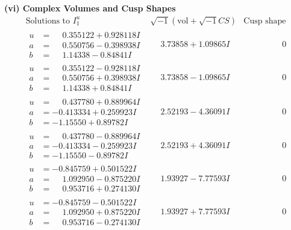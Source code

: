 \documentclass[1p]{elsarticle_modified}
\theoremstyle{definition}
\newcommand{\I}{\sqrt{-1}}
\begin{document}
\newpage\flushleft \textbf{(vi) Complex Volumes and Cusp Shapes}
$$\begin{array}{c|c|c}  
\text{Solutions to }I^u_{1}& \I (\text{vol} + \sqrt{-1}CS) & \text{Cusp shape}\\
 \hline 
\begin{aligned}
u &= \phantom{-}0.355122 + 0.928118 I \\
a &= \phantom{-}0.550756 - 0.398938 I \\
b &= \phantom{-}1.14338 - 0.84841 I\end{aligned}
 & \phantom{-}3.73858 + 1.09865 I & \phantom{-0.000000 } 0 \\ \hline\begin{aligned}
u &= \phantom{-}0.355122 - 0.928118 I \\
a &= \phantom{-}0.550756 + 0.398938 I \\
b &= \phantom{-}1.14338 + 0.84841 I\end{aligned}
 & \phantom{-}3.73858 - 1.09865 I & \phantom{-0.000000 } 0 \\ \hline\begin{aligned}
u &= \phantom{-}0.437780 + 0.889964 I \\
a &= -0.413334 + 0.259923 I \\
b &= -1.15550 + 0.89782 I\end{aligned}
 & \phantom{-}2.52193 - 4.36091 I & \phantom{-0.000000 } 0 \\ \hline\begin{aligned}
u &= \phantom{-}0.437780 - 0.889964 I \\
a &= -0.413334 - 0.259923 I \\
b &= -1.15550 - 0.89782 I\end{aligned}
 & \phantom{-}2.52193 + 4.36091 I & \phantom{-0.000000 } 0 \\ \hline\begin{aligned}
u &= -0.845759 + 0.501522 I \\
a &= \phantom{-}1.092950 - 0.875220 I \\
b &= \phantom{-}0.953716 + 0.274130 I\end{aligned}
 & \phantom{-}1.93927 - 7.77593 I & \phantom{-0.000000 } 0 \\ \hline\begin{aligned}
u &= -0.845759 - 0.501522 I \\
a &= \phantom{-}1.092950 + 0.875220 I \\
b &= \phantom{-}0.953716 - 0.274130 I\end{aligned}
 & \phantom{-}1.93927 + 7.77593 I & \phantom{-0.000000 } 0 \\ \hline\begin{aligned}

\end{aligned}
\end{array}$$
\end{document}
